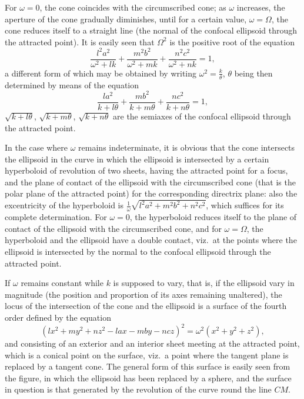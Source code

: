 \documentclass[11pt,a4paper]{article}
\theoremstyle{definition}
\begin{document}
\newpage

\setcounter{page}{433}

For $\omega = 0$, the cone coincides with the circumscribed cone; as $\omega$ increases, the aperture of the cone gradually diminishes, until for a certain value, $\omega = \Omega$, the cone reduces itself to a straight line (the normal of the confocal ellipsoid through the attracted point). It is easily seen that $\Omega^{2}$ is the positive root of the equation
\[
\frac{l^{2}a^{2}}{\omega^{2} + lk} + \frac{m^{2}b^{2}}{\omega^{2} + mk} + \frac{n^{2}c^{2}}{\omega^{2} + nk} = 1,
\]
a different form of which may be obtained by writing $\omega^{2} = \frac{k}{\theta}$, $\theta$ being then determined by means of the equation
\[
\frac{la^{2}}{k + l\theta} + \frac{mb^{2}}{k + m\theta} + \frac{nc^{2}}{k + n\theta} = 1,
\]
$\sqrt{k + l\theta}$, $\sqrt{k + m\theta}$, $\sqrt{k + n\theta}$ are the semiaxes of the confocal ellipsoid through the attracted point.

In the case where $\omega$ remains indeterminate, it is obvious that the cone intersects the ellipsoid in the curve in which the ellipsoid is intersected by a certain hyperboloid of revolution of two sheets, having the attracted point for a focus, and the plane of contact of the ellipsoid with the circumscribed cone (that is the polar plane of the attracted point) for the corresponding directrix plane: also the excentricity of the hyperboloid is $\frac{1}{\omega}\sqrt{l^{2}a^{2} + m^{2}b^{2} + n^{2}c^{2}}$, which suffices for its complete determination. For $\omega = 0$, the hyperboloid reduces itself to the plane of contact of the ellipsoid with the circumscribed cone, and for $\omega = \Omega$, the hyperboloid and the ellipsoid have a double contact, viz.\ at the points where the ellipsoid is intersected by the normal to the confocal ellipsoid through the attracted point.

If $\omega$ remains constant while $k$ is supposed to vary, that is, if the ellipsoid vary in magnitude (the position and proportion of its axes remaining unaltered), the locus of the intersection of the cone and the ellipsoid is a surface of the fourth order defined by the equation
\[
(lx^{2} + my^{2} + nz^{2} - lax - mby - ncz)^{2} = \omega^{2}(x^{2} + y^{2} + z^{2}),
\]
and consisting of an exterior and an interior sheet meeting at the attracted point, which is a conical point on the surface, viz.\ a point where the tangent plane is replaced by a tangent cone. The general form of this surface is easily seen from the figure, in which the ellipsoid has been replaced by a sphere, and the surface in question is that generated by the revolution of the curve round the line $CM$.
\end{document}
